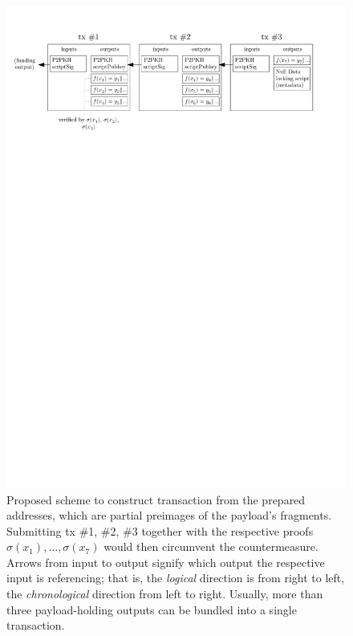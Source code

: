 \documentclass[a4paper,11pt,titlepage]{scrbook}
\begin{document}
\begin{figure}
    \centering
    \includegraphics[width=14cm,keepaspectratio]{figure.pdf}
    \caption[Proposed scheme to construct transaction from the prepared addresses to circumvent the countermeasure]{Proposed scheme to construct transaction from the prepared addresses, which are partial preimages of the payload's fragments. Submitting tx \#1, \#2, \#3 together with the respective proofs $\sigma(x_1), \dots, \sigma(x_7)$ would then circumvent the countermeasure. Arrows from input to output signify which output the respective input is referencing; that is, the \emph{logical} direction is from right to left, the \emph{chronological} direction from left to right. Usually, more than three payload-holding outputs can be bundled into a single transaction.}
    \label{fig:tx-construction}
\end{figure}
\end{document}
